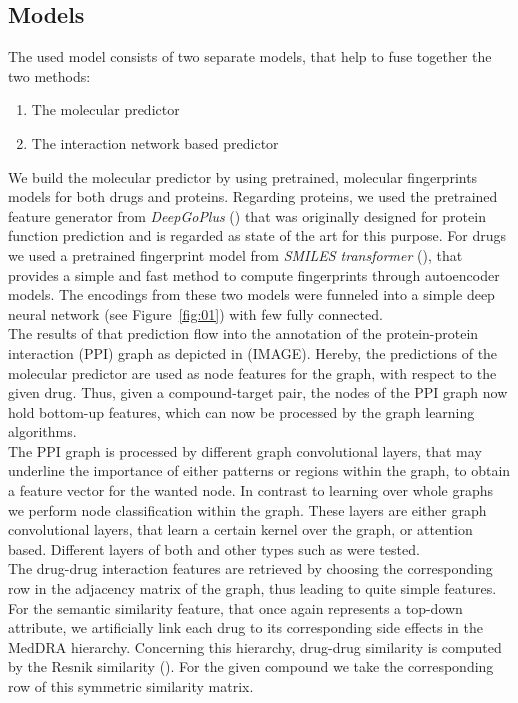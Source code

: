 \documentclass{bioinfo}
\renewcommand{\cite}{\citep}
\begin{document}
\subsection{Models}
The used model consists of two separate models, that help to fuse together the two methods:
\begin{enumerate}
	\item The molecular predictor
	\item The interaction network based predictor
\end{enumerate}
We build the molecular predictor by using pretrained, molecular fingerprints models for both drugs and proteins. Regarding proteins, we used the pretrained feature generator from \textit{DeepGoPlus} (\citep{DeepGoPlus}) that was originally designed for protein function prediction and is regarded as state of the art for this purpose. For drugs we used a pretrained fingerprint model from \textit{SMILES transformer} (\cite{SmilesTransformer}), that provides a simple and fast method to compute fingerprints through autoencoder models. The encodings from these two models were funneled into a simple deep neural network (see Figure~\ref{fig:01}) with few fully connected. \\
The results of that prediction flow into the annotation of the protein-protein interaction (PPI) graph as depicted in (IMAGE). Hereby, the predictions of the molecular predictor are used as node features for the graph, with respect to the given drug. Thus, given a compound-target pair, the nodes of the PPI graph now hold bottom-up features, which can now be processed by the graph learning algorithms. \\
The PPI graph is processed by different graph convolutional layers, that may underline the importance of either patterns or regions within the graph, to obtain a feature vector for the wanted node. In contrast to learning over whole graphs we perform node classification within the graph. These layers are either graph convolutional layers, that learn a certain kernel over the graph, or attention based. Different layers of both and other types such as were tested.  \\
The drug-drug interaction features are retrieved by choosing the corresponding row in the adjacency matrix of the graph, thus leading to quite simple features. \\
For the semantic similarity feature, that once again represents a top-down attribute, we artificially link each drug to its corresponding side effects in the MedDRA hierarchy. Concerning this hierarchy, drug-drug similarity is computed by the Resnik similarity (\cite{Resnik1995}). For the given compound we take the corresponding row of this symmetric similarity matrix. \\
\end{document}
